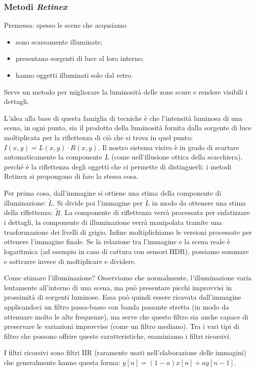 \documentclass[a4paper,11pt]{article}
\begin{document}
\subsubsection{Metodi \textit{Retinex}}
Premessa: spesso le scene che acqusiamo
\begin{itemize}
    \item sono scarsamente illuminate;
    \item presentano sorgenti di luce al loro interno;
    \item hanno oggetti illuminati solo dal retro.
\end{itemize}
Serve un metodo per migliorare la luminosità delle zone scure e rendere visibili i dettagli.
\par
L'idea alla base di questa famiglia di tecniche è che l'intensità luminosa di una scena, in ogni punto, sia il prodotto della luminosità fornita dalla
sorgente di luce moltiplicata per la riflettenza di ciò che si trova in quel punto: $I(x,y) = L(x,y) \cdot R(x,y)$.
Il nostro sistema visivo è in grado di scartare automaticamente la componente $L$ (come nell'illusione ottica della scacchiera), perché è la riflettenza degli oggetti che ci permette di distinguerli:
i metodi Retinex si propongono di fare la stessa cosa.
\par
Per prima cosa, dall'immagine si ottiene una stima della componente di illuminazione: $\tilde{L}$. Si divide poi l'immagine per $\tilde{L}$ in modo
da ottenere una stima della riflettenza: $\tilde{R}$. La componente di riflettenza verrà processata per enfatizzare i dettagli, la componente di
illuminazione verrà manipolata tramite una trasformazione dei livelli di grigio. Infine moltiplichiamo le versioni processate per ottenere l'immagine finale.
Se la relazione tra l'immagine e la scena reale è logaritmica (ad esempio in caso di cattura con sensori HDR), possiamo sommare e sottrarre invece di
moltiplicare e dividere.
\par
Come stimare l'illuminazione? Osserviamo che normalmente, l'illuminazione varia lentamente all'interno di una scena, ma può presentare picchi improvvisi in
prossimità di sorgenti luminose. Essa può quindi essere ricavata dall'immagine applicandoci un filtro passa-basso con banda passante stretta (in modo da
attenuare molto le alte frequenze), ma serve che questo filtro sia anche capace di preservare le variazioni improvvise (come un filtro mediano).
Tra i vari tipi di filtro che possono offrire queste caratteristiche, esaminiamo i filtri ricorsivi.
\par
I filtri ricorsivi sono filtri IIR (raramente usati nell'elaborazione delle immagini) che generalmente hanno questa forma: $y[n] = (1-a) x[n] + a y[n-1]$.
\end{document}
